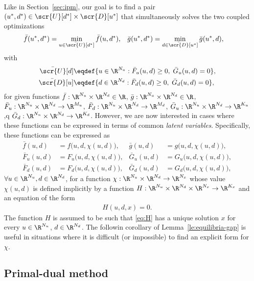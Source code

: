 \documentclass[11pt]{article}
\begin{document}
Like in Section~\ref{sec:ipm}, our goal is to find a pair
$(u^*,d^*)\in\scr{U}[d^*]\times\scr{D}[u^*]$ that simultaneously solves the
two coupled optimizations
\begin{align}\label{eq:equilibria-bar}
  \bar f(u^*,d^*)&=\min_{u\in\bar{\scr{U}}[d^*]} \bar f(u,d^*), &
  \bar g(u^*,d^*)&=\min_{d\in\bar{\scr{D}}[u^*]} \bar g(u^*,d),
\end{align}
with
\begin{subequations}
  \label{eq:U-D-bar}
  \begin{align}
    \bar{\scr{U}}[d]&\eqdef\{u\in\R^{N_u}: \bar F_u(u,d)\ge 0,\; \bar G_u(u,d)=0\}, \\
    \bar{\scr{D}}[u]&\eqdef\{d\in\R^{N_d}: \bar F_d(u,d)\ge 0,\; \bar G_d(u,d)=0\},
  \end{align}
\end{subequations}
for given functions $\bar f:\R^{N_u}\times\R^{N_d}\in\R$, $\bar
g:\R^{N_u}\times\R^{N_d}\in\R$, $\bar F_u:\R^{N_u}\times\R^{N_d}\to\R^{M_u}$, $\bar
F_d:\R^{N_u}\times\R^{N_d}\to\R^{M_d}$, $\bar G_u:\R^{N_u}\times\R^{N_d}\to\R^{K_u}$,q
$\bar G_d:\R^{N_u}\times\R^{N_d}\to\R^{K_d}$. However, we are now interested in
cases where these functions can be expressed in terms of common
\emph{latent variables}. Specifically, these functions can be
expressed as
\begin{align*}
  \bar f(u,d)&=f\big(u,d,\chi(u,d)\big), &
  \bar g(u,d)&=g\big(u,d,\chi(u,d)\big), \\
  \bar F_u(u,d)&=F_u\big(u,d,\chi(u,d)\big), &
  \bar G_u(u,d)&=G_u\big(u,d,\chi(u,d)\big), \\
  \bar F_d(u,d)&=F_d\big(u,d,\chi(u,d)\big), & \bar
  G_d(u,d)&=G_d\big(u,d,\chi(u,d)\big),
\end{align*}
$\forall u\in\R^{N_u},d\in\R^{N_d}$, for a function $\chi:\R^{N_u}\times\R^{N_d}\to\R^{N_x}$
whose value $\chi(u,d)$ is defined implicitly by a function
$H:\R^{N_u}\times\R^{N_d}\times\R^{N_x}\to\R^{K_x}$ and an equation of the form
\begin{align}\label{eq:H}
  H(u,d,x)=0.
\end{align}
The function $H$ is assumed to be such that \eqref{eq:H} has a unique
solution $x$ for every $u\in\R^{N_u}$, $d\in\R^{N_d}$. The followin
corollary of Lemma~\ref{le:equilibria-gap} is useful in situations
where it is difficult (or impossible) to find an explicit form for
$\chi$.

\subsection{Primal-dual method}
\end{document}
